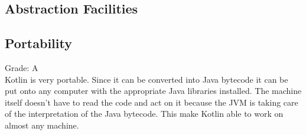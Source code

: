 \subsection{Abstraction Facilities}

\subsection{Portability}
Grade: A
\\
Kotlin is very portable. Since it can be converted into Java bytecode it can be put onto any computer with the appropriate Java libraries installed. The machine itself doesn't have to read the code and act on it because the JVM is taking care of the interpretation of the Java bytecode. This make Kotlin able to work on almost any machine. 